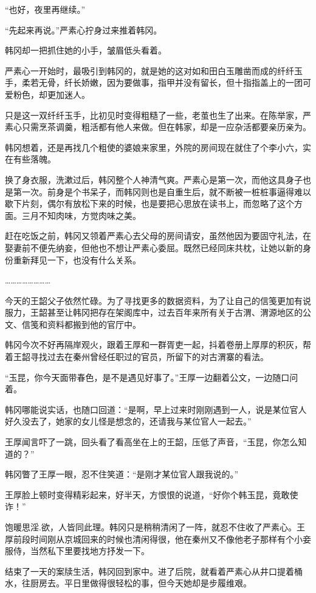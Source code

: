 “也好，夜里再继续。”

“先起来再说。”严素心拧身过来推着韩冈。

韩冈却一把抓住她的小手，皱眉低头看着。

严素心一开始时，最吸引到韩冈的，就是她的这对如和田白玉雕凿而成的纤纤玉手，柔若无骨，纤长娇嫩，因为要做事，指甲并没有留长，但十指指盖上的一团可爱粉色，却更加迷人。

只是这一双纤纤玉手，比初见时变得粗糙了一些，老茧也生了出来。在陈举家，严素心只需烹茶调羹，粗活都有他人来做。但在韩家，却是一应杂活都要亲历亲为。

韩冈想着，还是再找几个粗使的婆娘来家里，外院的房间现在就住了个李小六，实在有些落魄。

换了身衣服，洗漱过后，韩冈整个人神清气爽。严素心是第一次，而他这具身子也是第一次。前身是个书呆子，而韩冈则也是自重生后，就不断被一桩桩事逼得难以歇下片刻，偶尔有放松下来的时候，也是要把心思放在读书上，而忽略了这个方面。三月不知肉味，方觉肉味之美。

赶在吃饭之前，韩冈又领着严素心去父母的房间请安，虽然他因为要固守礼法，在娶妻前不便先纳妾，但他也不想让严素心委屈。既然已经同床共枕，让她以新的身份重新拜见一下，也没有什么关系。

……………………

今天的王韶父子依然忙碌。为了寻找更多的数据资料，为了让自己的信笺更加有说服力，王韶甚至让韩冈把存在架阁库中，过去百年来所有关于古渭、渭源地区的公文、信笺和资料都搬到他的官厅中。

韩冈今次不好再隔岸观火，跟着王厚和一群胥吏一起，抖着卷册上厚厚的积灰，帮着王韶寻找过去在秦州曾经任职过的官员，所留下的对古渭寨的看法。

“玉昆，你今天面带春色，是不是遇见好事了。”王厚一边翻着公文，一边随口问着。

韩冈哪能说实话，也随口回道：“是啊，早上过来时刚刚遇到一人，说是某位官人好久没去了，她家的女儿怪是想念的，还请我与某位官人一起去。”

王厚闻言吓了一跳，回头看了看高坐在上的王韶，压低了声音，“玉昆，你怎么知道的？”

韩冈瞥了王厚一眼，忍不住笑道：“是刚才某位官人跟我说的。”

王厚脸上顿时变得精彩起来，好半天，方恨恨的说道，“好你个韩玉昆，竟敢使诈！”

饱暖思淫.欲，人皆同此理。韩冈只是稍稍清闲了一阵，就忍不住收了严素心。王厚前段时间刚从京城回来的时候也清闲得很，他在秦州又不像他老子那样有个小妾服侍，当然私下里要找地方抒发一下。

结束了一天的案牍生活，韩冈回到家中。进了后院，就看着严素心从井口提着桶水，往厨房去。平日里做得很轻松的事，但今天她却是步履维艰。

